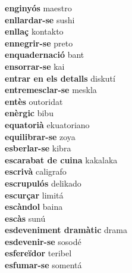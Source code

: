 \textbf{ enginyós  } maestro \\
\textbf{ enllardar-se  } sushi \\
\textbf{ enllaç  } kontakto \\
\textbf{ ennegrir-se  } preto \\
\textbf{ enquadernació  } bant \\
\textbf{ ensorrar-se  } kai \\
\textbf{ entrar en els detalls  } diskutí \\
\textbf{ entremesclar-se  } meskla \\
\textbf{ entès  } outoridat \\
\textbf{ enèrgic  } bibu \\
\textbf{ equatorià  } ekuatoriano \\
\textbf{ equilibrar-se  } zoya \\
\textbf{ esberlar-se  } kibra \\
\textbf{ escarabat de cuina  } kakalaka \\
\textbf{ escrivà  } caligrafo \\
\textbf{ escrupulós  } delikado \\
\textbf{ escurçar  } limitá \\
\textbf{ escàndol  } baina \\
\textbf{ escàs  } sunú \\
\textbf{ esdeveniment dramàtic  } drama \\
\textbf{ esdevenir-se  } sosodé \\
\textbf{ esfereïdor  } teribel \\
\textbf{ esfumar-se  } somentá \\
